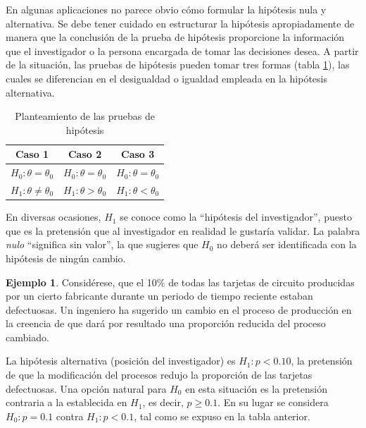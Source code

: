 \documentclass[
]{book}
\theoremstyle{definition}
\theoremstyle{definition}
\newtheorem{example}{Ejemplo}[chapter]
\theoremstyle{definition}
\theoremstyle{definition}
\theoremstyle{remark}
\begin{document}
En algunas aplicaciones no parece obvio cómo formular la hipótesis nula y alternativa. Se debe tener cuidado en estructurar la hipótesis apropiadamente de manera que la conclusión de la prueba de hipótesis proporcione la información que el investigador o la persona encargada de tomar las decisiones desea. A partir de la situación, las pruebas de hipótesis pueden tomar tres formas (tabla \ref{tab:hipotesis}), las cuales se diferencian en el desigualdad o igualdad empleada en la hipótesis alternativa.

\begin{table}[H]

\caption{\label{tab:hipotesis}Planteamiento de las pruebas de hipótesis}
\centering
\begin{tabular}[t]{ccc}
\toprule
Caso 1 & Caso 2 & Caso 3\\
\midrule
$H_0: \theta = \theta_0$ & $H_0: \theta = \theta_0$ & $H_0: \theta = \theta_0$\\
$H_1: \theta \neq \theta_0$ & $H_1: \theta > \theta_0$ & $H_1:\theta < \theta_0$\\
\bottomrule
\end{tabular}
\end{table}

En diversas ocasiones, \(H_1\) se conoce como la ``hipótesis del investigador'', puesto que es la pretensión que al investigador en realidad le gustaría validar. La palabra \emph{nulo} ``significa sin valor'', la que sugieres que \(H_0\) no deberá ser identificada con la hipótesis de ningún cambio.

\begin{example}
Considérese, que el 10\% de todas las tarjetas de circuito producidas por un cierto fabricante durante un periodo de tiempo reciente estaban defectuosas. Un ingeniero ha sugerido un cambio en el proceso de producción en la creencia de que dará por resultado una proporción reducida del proceso cambiado.

La hipótesis alternativa (posición del investigador) es \(H_1: p <0.10\), la pretensión de que la modificación del procesos redujo la proporción de las tarjetas defectuosas. Una opción natural para \(H_0\) en esta situación es la pretensión contraria a la establecida en \(H_1\), es decir, \(p\geq 0.1\). En su lugar se considera \(H_0: p = 0.1\) contra \(H_1: p < 0.1\), tal como se expuso en la tabla anterior.
\end{example}
\end{document}
